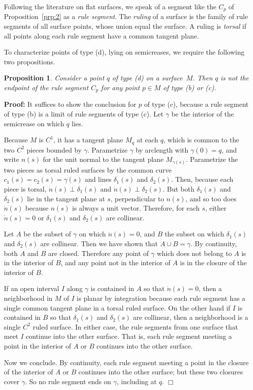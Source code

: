 \documentclass[11pt,letterpaper]{article}
\newtheorem{proposition}[theorem]{Proposition}
\newenvironment{proof}{\noindent\textbf{Proof: }\ignorespaces}
  {\hspace*{\fill}$\Box$\medskip}
\newcommand\term[1]{\emph{#1}}
\begin{document}
Following the literature on flat surfaces, we speak of a segment like
the $C_p$ of Proposition~\ref{prp:2} as a \term{rule segment}.
The \term{ruling} of a surface is the family of rule segments of all
surface points, whose union equal the surface.
A ruling is \term{torsal} if all points along each rule segment
have a common tangent plane.

To characterize points of type (d), lying on semicreases, we require
the following two propositions.

\begin{proposition}\label{prp:6}
  Consider a point $q$ of type (d) on a surface~$M$.
  Then $q$ is not the endpoint of the rule segment $C_p$
  for any point $p \in M$ of type (b) or (c).
\end{proposition}
\begin{proof}
  It suffices to show the conclusion for $p$ of type (c), because a
  rule segment of type (b) is a limit of rule segments of type (c).
  Let $\gamma$ be the interior of the semicrease on which $q$ lies.

  Because $M$ is $C^1$, it has a tangent plane $M_q$ at each $q$, which
  is common to the two $C^2$ pieces bounded by $\gamma$.  Parametrize
  $\gamma$ by arclength with $\gamma(0) = q$, and write $n(s)$ for the
  unit normal to the tangent plane $M_{\gamma(s)}$.  Parametrize the
  two pieces as torsal ruled surfaces by the common curve $c_1(s) =
  c_2(s) = \gamma(s)$ and lines $\delta_1(s)$ and $\delta_2(s)$.
  Then, because each piece is torsal, $\dot n(s) \perp \delta_1(s)$ and
  $\dot n(s) \perp \delta_2(s)$.  But both $\delta_1(s)$ and $\delta_2(s)$
  lie in the tangent plane at $s$, perpendicular to $n(s)$, and so too
  does $\dot n(s)$ because $n(s)$ is always a unit vector.  Therefore,
  for each $s$, either $\dot n(s) = 0$ or $\delta_1(s)$ and $\delta_2(s)$
  are collinear.

  Let $A$ be the subset of $\gamma$ on which $\dot n(s) = 0$, and $B$
  the subset on which $\delta_1(s)$ and $\delta_2(s)$ are collinear.
  Then we have shown that $A \cup B = \gamma$.  By continuity, both
  $A$ and $B$ are closed.  Therefore any point of $\gamma$ which does
  not belong to $A$ is in the interior of $B$, and any point not in
  the interior of $A$ is in the closure of the interior of $B$.

  If an open interval $I$ along $\gamma$ is contained in $A$ so that
  $\dot n(s) = 0$, then a neighborhood in $M$ of $I$ is planar by
  integration because each rule segment has a single common tangent
  plane in a torsal ruled surface.  On the other hand if $I$ is
  contained in $B$ so that $\delta_1(s)$ and $\delta_2(s)$ are
  collinear, then a neighborhood is a single $C^2$ ruled surface.  In
  either case, the rule segments from one surface that meet $I$
  continue into the other surface.  That is, each rule segment meeting
  a point in the interior of $A$ or $B$ continues into the other
  surface.

  Now we conclude.  By continuity, each rule segment meeting a point
  in the closure of the interior of $A$ or $B$ continues into the
  other surface; but these two closures cover $\gamma$.  So no rule
  segment ends on $\gamma$, including at $q$.
\end{proof}
\end{document}
